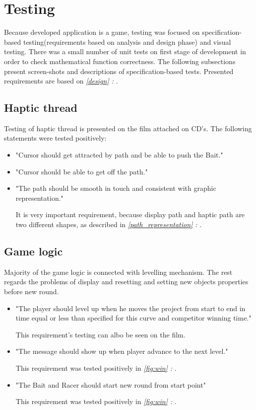 \section{Testing}
Because developed application is a game, testing was focused on specification-based testing(requirements based on analysis and design phase) and visual testing. There was a small number of unit tests on first stage of development in order to check mathematical function correctness. 
The following subsections present screen-shots and descriptions of specification-based tests. Presented requirements are based on \emph{\ref{design} : }.

\subsection{Haptic thread}
Testing of haptic thread is presented on the film attached on CD's. The following statements were tested positively:
\begin{itemize} [noitemsep]
\item "Cursor should get attracted by path and be able to push the Bait."
\item "Cursor should be able to get off the path."
\item "The path should be smooth in touch and consistent with graphic representation."

It is very important requirement, because display path and haptic path are two different shapes, as described in \emph{\ref{path_representation} : }. 
\end{itemize}
\subsection{Game logic}
Majority of the game logic is connected with levelling mechanism. The rest regards the problems of display and resetting and setting new objects properties before new round.
\begin{itemize} [noitemsep]
\item "The player should level up when he moves the project from start to end in time equal or less than specified for this curve and competitor winning time."

This requirement's testing can albo be seen on the film.
\item "The message should show up when player advance to the next level."

This requirement was tested positively in \emph{\ref{fig:win} : }.

\item "The Bait and Racer should start new round from start point"

This requirement was tested positively in \emph{\ref{fig:win} : }.
\end{itemize}


